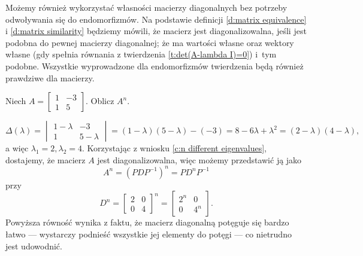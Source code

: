 Możemy również wykorzystać własności macierzy diagonalnych bez potrzeby odwoływania się do endomorfizmów. Na podstawie definicji \ref{d:matrix equivalence} i \ref{d:matrix similarity} będziemy mówili, że macierz jest diagonalizowalna, jeśli jest podobna do pewnej macierzy diagonalnej; że ma wartości własne oraz wektory własne (gdy spełnia równania z twierdzenia \ref{t:det(A-lambda I)=0}) i~tym podobne. Wszystkie wyprowadzone dla endomorfizmów twierdzenia będą również prawdziwe dla macierzy.

\begin{example}
    Niech $A = \begin{bmatrix}
        1 & -3 \\
        1 & 5
    \end{bmatrix}$. Oblicz $A^n$.
\end{example}
\begin{solution}
    \[ \Delta(\lambda) = \begin{vmatrix}
        1 - \lambda & -3 \\
        1 & 5 - \lambda
    \end{vmatrix} = (1-\lambda)(5-\lambda) - (-3) = 8 - 6\lambda + \lambda^2 = (2 - \lambda)(4 - \lambda), \]
    a więc $\lambda_1 = 2, \lambda_2 = 4$. Korzystając z wniosku \ref{c:n different eigenvalues}, dostajemy, że macierz $A$ jest diagonalizowalna, więc możemy przedstawić ją jako
    \[ A^n = (PDP^{-1})^n = PD^nP^{-1} \]
    przy
    \[ D^n = \begin{bmatrix}
        2 & 0 \\
        0 & 4
    \end{bmatrix}^n = \begin{bmatrix}
        2^n & 0 \\
        0 & 4^n
    \end{bmatrix}. \]
    Powyższa równość wynika z faktu, że macierz diagonalną potęguje się bardzo łatwo --- wystarczy podnieść wszystkie jej elementy do potęgi --- co nietrudno jest udowodnić.


\end{solution}
